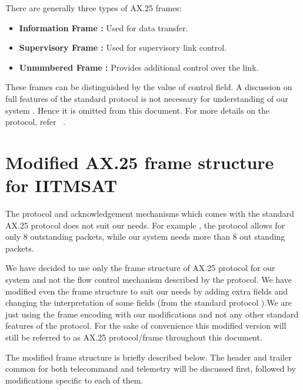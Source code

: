\documentclass[BTech]{iitmdiss}
\begin{document}
\par There are generally three types of AX.25 frames:
\begin{itemize}
\item  \textbf{Information Frame : }Used for data transfer.
\item \textbf{Supervisory Frame : }Used for supervisory link control.
\item \textbf{Unnumbered Frame : } Provides additional control over the link.
\end{itemize}
These frames can be distinguished by the value of control field. A discussion on full features of the standard protocol is not necessary for understanding of our system . Hence it is omitted from this document. For more details on the protocol, refer ~\citep{ax25}. 

\section{Modified AX.25 frame structure for IITMSAT }
The protocol and acknowledgement mechanisms which comes with the standard AX.25 protocol does not suit our needs. For example , the protocol allows for only 8 outstanding packets, while our system needs more than 8 out standing packets.

\par We have decided to use only the frame structure of AX.25 protocol for our system and not the flow control mechanism described by the protocol. We have modified even the frame structure to suit our needs by adding extra fields and changing the interpretation of some fields (from the standard protocol ).We are just using the frame encoding with our modifications and not any other standard features of the protocol. For the sake of convenience this modified version will still be referred to as AX.25 protocol/frame throughout this document. 
\par  The modified frame structure is briefly described below. The header and trailer common for both telecommand and telemetry will be discussed first, followed by modifications specific to each of them.
\end{document}
